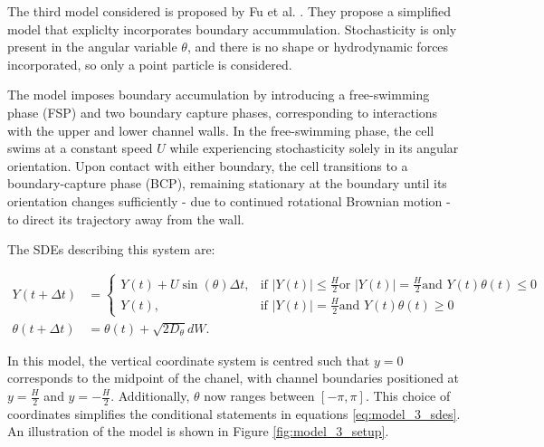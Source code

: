 The third model considered is proposed by Fu et al. \cite{fu2021fokker}. They
propose a simplified model that expliclty incorporates boundary accummulation. Stochasticity is
only present in the angular variable $\theta$, and there is no shape or hydrodynamic 
forces incorporated, so only a point particle is considered.

The model imposes boundary accumulation by introducing a free-swimming phase (FSP) and two boundary
capture phases, corresponding to interactions with the upper and lower channel walls. In the 
free-swimming phase, the cell swims at a constant speed $U$ while experiencing stochasticity solely
in its angular orientation. Upon contact with either boundary, the cell transitions to a 
boundary-capture phase (BCP), remaining stationary at the boundary until its orientation changes
sufficiently - due to continued rotational Brownian motion - to direct its trajectory away from
the wall. 

The SDEs describing this system are:

\begin{subequations}\label{eq:model_3_sdes}
    \begin{align}
        Y(t + \Delta t) &=
        \begin{cases}
            Y(t) + U \sin(\theta) \Delta t, & \text{if } |Y(t)| \le \frac{H}{2} \text{or } 
            |Y(t)| = \frac{H}{2} \text{and } Y(t) \theta(t) \leq 0 \\
            Y(t), & \text{if } |Y(t)| = \frac{H}{2} \text{and } Y(t) \theta(t) \ge 0
        \end{cases} \\
        \theta(t + \Delta t) &= \theta(t) + \sqrt{2D_{\theta}}dW.
    \end{align}
\end{subequations}

In this model, the vertical coordinate system is centred such that $y=0$ corresponds to the 
midpoint of the chanel, with channel boundaries positioned at $y=\frac{H}{2}$ and 
$y = -\frac{H}{2}$. Additionally, $\theta$ now ranges between $[-\pi, \pi]$. This choice
of coordinates simplifies the conditional statements in equations \eqref{eq:model_3_sdes}.
An illustration of the model is shown in Figure \ref{fig:model_3_setup}. 

